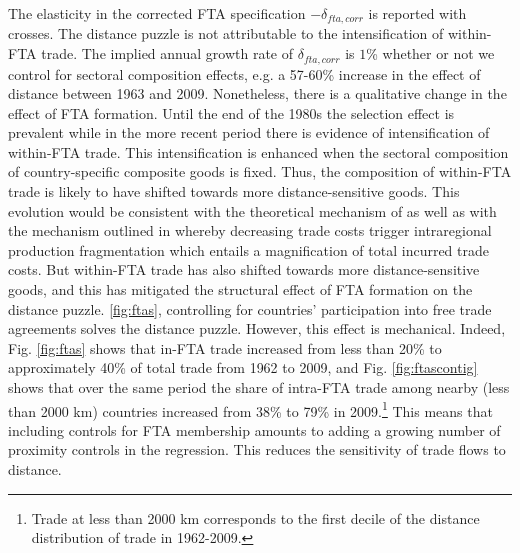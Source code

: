 \documentclass[12pt,twoside,a4paper,notitlepage]{article}
\begin{document}
The elasticity in the corrected FTA specification $-\delta_{fta,corr}$ is reported with crosses.
The distance puzzle is not attributable to the intensification of within-FTA trade.
The implied annual growth rate of $\delta_{fta,corr}$ is $1$\% whether or not we control for sectoral composition effects, e.g.
a 57-60\% increase in the effect of distance between 1963 and 2009.
Nonetheless, there is a qualitative change in the effect of FTA formation.
Until the end of the 1980s the selection effect is prevalent while in the more recent period there is evidence of intensification of within-FTA trade.
This intensification is enhanced when the sectoral composition of country-specific composite goods is fixed.
Thus, the composition of within-FTA trade is likely to have shifted towards more distance-sensitive goods.
This evolution would be consistent with the theoretical mechanism of \cite{Duranton2008} as well as with the mechanism outlined in \cite{Yi2010} whereby decreasing trade costs trigger intraregional production fragmentation which entails a magnification of total incurred trade costs.
But within-FTA trade has also shifted towards more distance-sensitive goods, and this has mitigated the structural effect of FTA formation on the distance puzzle.
\ref{fig:ftas}, controlling for countries' participation into free trade agreements solves the distance puzzle.
However, this effect is mechanical.
Indeed, Fig.
\ref{fig:ftas} shows that in-FTA trade increased from less than 20\% to approximately 40\% of total trade from 1962 to 2009, and Fig.
\ref{fig:ftascontig} shows that over the same period the share of intra-FTA trade among nearby (less than 2000 km) countries increased from 38\% to 79\% in 2009.\footnote{Trade at less than 2000 km corresponds to the first decile of the distance distribution of trade in 1962-2009.} This means that including controls for FTA membership amounts to adding a growing number of proximity controls in the regression.
This reduces the sensitivity of trade flows to distance.
\end{document}

